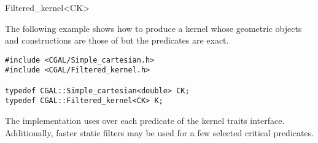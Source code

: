 \begin{ccRefClass}{Filtered_kernel<CK>}
\ccIsModel
{}

\ccTypes

\ccGlue
{}

\ccConstants


\ccExample

The following example shows how to produce a kernel whose geometric
objects and constructions are those of 
but the predicates are exact. 

\begin{verbatim}
#include <CGAL/Simple_cartesian.h>
#include <CGAL/Filtered_kernel.h>

typedef CGAL::Simple_cartesian<double> CK;
typedef CGAL::Filtered_kernel<CK> K;

\end{verbatim}

\ccImplementation
The implementation uses  over
each predicate of the kernel traits interface.  Additionally, faster static
filters may be used for a few selected critical predicates.

\end{ccRefClass}
